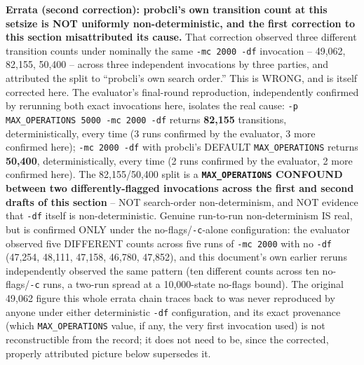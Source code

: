 \documentclass[a4paper,10pt,fleqn]{article}
\newcommand{\field}[1]{\texttt{#1}}
\begin{document}
\textbf{Errata (second correction): probcli's own transition count at
this setsize is NOT uniformly non-deterministic, and the first
correction to this section misattributed its cause.} That correction
observed three different transition counts under nominally the same
\texttt{-mc 2000 -df} invocation -- 49,062, 82,155, 50,400 -- across
three independent invocations by three parties, and attributed the
split to ``probcli's own search order.'' This is WRONG, and is itself
corrected here. The evaluator's final-round reproduction, independently
confirmed by rerunning both exact invocations here, isolates the real
cause: \texttt{-p MAX\_OPERATIONS 5000 -mc 2000 -df} returns
\textbf{82,155} transitions, deterministically, every time (3 runs
confirmed by the evaluator, 3 more confirmed here); \texttt{-mc 2000
-df} with probcli's DEFAULT \field{MAX\_OPERATIONS} returns
\textbf{50,400}, deterministically, every time (2 runs confirmed by the
evaluator, 2 more confirmed here). The 82,155/50,400 split is a
\textbf{\field{MAX\_OPERATIONS} CONFOUND between two differently-flagged
invocations across the first and second drafts of this section} -- NOT
search-order non-determinism, and NOT evidence that \texttt{-df} itself
is non-deterministic. Genuine run-to-run non-determinism IS real, but
is confirmed ONLY under the no-flags/\texttt{-c}-alone configuration:
the evaluator observed five DIFFERENT counts across five runs of
\texttt{-mc 2000} with no \texttt{-df} (47,254, 48,111, 47,158, 46,780,
47,852), and this document's own earlier reruns independently observed
the same pattern (ten different counts across ten no-flags/\texttt{-c}
runs, a two-run spread at a 10,000-state no-flags bound). The original
49,062 figure this whole errata chain traces back to was never
reproduced by anyone under either deterministic \texttt{-df}
configuration, and its exact provenance (which \field{MAX\_OPERATIONS}
value, if any, the very first invocation used) is not reconstructible
from the record; it does not need to be, since the corrected, properly
attributed picture below supersedes it.
\end{document}
